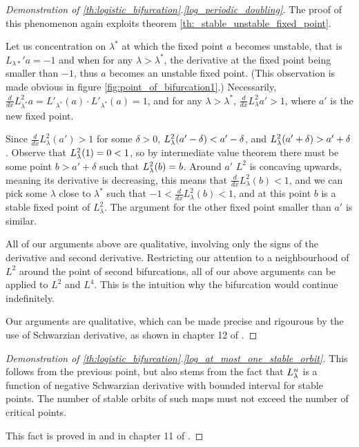 \begin{proof}[Demonstration of \ref{th:logistic_bifurcation}.\ref{log_periodic_doubling}]
	The proof of this phenomenon again exploits theorem \ref{th:_stable_unstable_fixed_point}.

	Let us concentration on $\lambda^*$ at which the fixed point $a$ becomes unstable, that is $L_{\lambda*}' a  = - 1$ and when for any $\lambda > \lambda^*$, the derivative at the fixed point being smaller than $-1$, thus $a$ becomes an unstable fixed point. (This observation is made obvious in figure \ref{fig:point_of_bifurcation1}.)
	Necessarily, $\frac{d}{dx}L_{\lambda^*}^2 a = L'_{\lambda^*}(a) \cdot L'_{\lambda^*}(a) = 1$,
	and for any $\lambda > \lambda^*$, $\frac{d}{dx}L_{\lambda}^2a'> 1$, where $a'$ is the new fixed point.

	Since $\frac{d}{dx}L_{\lambda}^2(a') > 1$ for some $\delta > 0$, $L_{\lambda}^2(a' - \delta) < a' - \delta$, and $L_{\lambda}^2(a' + \delta) > a' + \delta$. 
	Observe that $L_{\lambda}^2(1) = 0 < 1$, so by intermediate value theorem there must be some point $b > a' + \delta$ such that $L_{\lambda}^2(b) = b$. 
	Around $a'$ $L^2$ is concaving upwards, meaning its derivative is decreasing, this means that $\frac{d}{dx }L_{\lambda}^2(b) < 1$,
	and we can pick some $\lambda$  close to $\lambda ^*$ such that $-1<\frac{d}{dx }L_{\lambda}^2(b) < 1$, and at this point $b$ is a stable fixed point of $L_{\lambda}^2$.
	The argument for the other fixed point smaller than $a'$ is similar. 

	All of our arguments above are qualitative, involving only the signs of the derivative and second derivative. 
	Restricting our attention to a neighbourhood of $L^2$ around the point of second bifurcations, all of our above arguments can be applied to $L^2$ and $L^4$. 
	This is the intuition why the bifurcation would continue indefinitely.
	

	Our arguments are qualitative, which can be made precise and rigourous by the use of Schwarzian derivative, as shown in chapter 12 of \cite{Devaney_green_book_chaos_definition}.
\end{proof}

\begin{proof}[Demonstration of \ref{th:logistic_bifurcation}.\ref{log_at_most_one_stable_orbit}]
	This follows from the previous point, but also stems from the fact that $L_{\lambda}^n$ is a function of negative Schwarzian derivative with bounded interval for stable points.
	The number of stable orbits of such maps must not exceed the number of critical points.

	This fact is proved in \cite{Pierre_Collet} and in chapter 11 of \cite{Devaney_green_book_chaos_definition}.
\end{proof}



